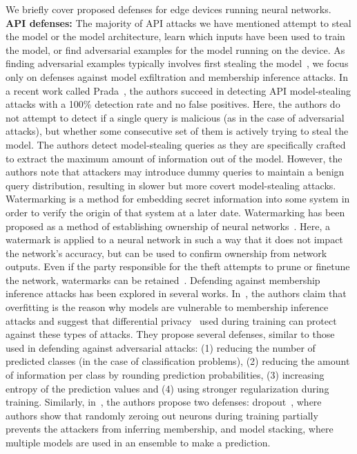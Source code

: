 We briefly cover proposed defenses for edge devices running neural networks. 
\noindent \textbf{API defenses:}
The majority of API attacks we have mentioned attempt to steal the model or the model architecture, learn which inputs have been used to train the model, or find adversarial examples for the model running on the device. As finding adversarial examples typically involves first stealing the model~, we focus only on defenses against model exfiltration and membership inference attacks.
In a recent work called Prada~, the authors succeed in detecting API model-stealing attacks with a 100\% detection rate and no false positives. Here, the authors do not attempt to detect if a single query is malicious (as in the case of adversarial attacks), but whether some consecutive set of them is actively trying to steal the model. The authors detect model-stealing queries as they are specifically crafted to extract the maximum amount of information out of the model. However, the authors note that attackers may introduce dummy queries to maintain a benign query distribution, resulting in slower but more covert model-stealing attacks.
Watermarking is a method for embedding secret information into some system in order to verify the origin of that system at a later date. Watermarking has been proposed as a method of establishing ownership of neural networks~. Here, a watermark is applied to a neural network in such a way that it does not impact the network's accuracy, but can be used to confirm ownership from network outputs. Even if the party responsible for the theft attempts to prune or finetune the network, watermarks can be retained~.
Defending against membership inference attacks has been explored in several works. In~, the authors claim that overfitting is the reason why models are vulnerable to membership inference attacks and suggest that differential privacy~ used during training can protect against these types of attacks. They propose several defenses, similar to those used in defending against adversarial attacks: (1) reducing the number of predicted classes (in the case of classification problems), (2) reducing the amount of information per class by rounding prediction probabilities, (3) increasing entropy of the prediction values and (4) using stronger regularization during training.
Similarly, in~, the authors propose two defenses: dropout~, where authors show that randomly zeroing out neurons during training partially prevents the attackers from inferring membership, and model stacking, where multiple models are used in an ensemble to make a prediction. 

